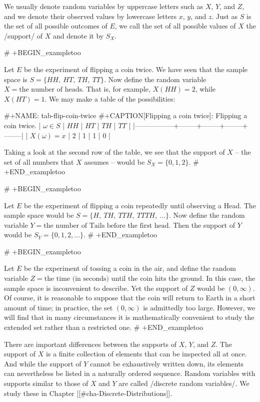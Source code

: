 We usually denote random variables by uppercase letters such as \(X\),
\(Y\), and \(Z\), and we denote their observed values by lowercase
letters \(x\), \(y\), and \(z\). Just as \(S\) is the set of all
possible outcomes of \(E\), we call the set of all possible values of
\(X\) the /support/ of \(X\) and denote it by \(S_{X}\).

# +BEGIN_exampletoo

Let \(E\) be the experiment of flipping a coin twice. We have seen
that the sample space is \( S = \{ HH,\ HT,\ TH,\ TT \} \). Now define
the random variable \(X = \mbox{the number of heads}\). That is, for
example, \(X(HH)=2\), while \(X(HT)=1\). We may make a table of the
possibilities:

#+NAME: tab-flip-coin-twice
#+CAPTION[Flipping a coin twice]: Flipping a coin twice.
| \(\omega\in S\) | \(HH\) | \(HT\) | \(TH\) | \(TT\) |
|-----------------+--------+--------+--------+--------|
| \(X(\omega)=x\) |      2 |      1 |      1 |      0 |

Taking a look at the second row of the table, we see that the support
of \(X\) -- the set of all numbers that \(X\) assumes -- would be \(
S_{X}= \{ 0,1,2 \} \).
# +END_exampletoo


# +BEGIN_exampletoo

Let \(E\) be the experiment of flipping a coin repeatedly until
observing a Head. The sample space would be \(S= \{ H,\ TH,\ TTH,\
TTTH,\ \ldots \} \). Now define the random variable \(Y=\mbox{the
number of Tails before the first head}\). Then the support of \(Y\)
would be \( S_{Y}= \{ 0,1,2,\ldots \} \).
# +END_exampletoo


# +BEGIN_exampletoo

Let \(E\) be the experiment of tossing a coin in the air, and define
the random variable \( Z = \mbox{the time (in seconds) until the coin
hits the ground} \). In this case, the sample space is inconvenient to
describe. Yet the support of \(Z\) would be \((0,\infty)\). Of course,
it is reasonable to suppose that the coin will return to Earth in a
short amount of time; in practice, the set \((0,\infty)\) is
admittedly too large. However, we will find that in many circumstances
it is mathematically convenient to study the extended set rather than
a restricted one.
# +END_exampletoo


There are important differences between the supports of \(X\), \(Y\),
and \(Z\). The support of \(X\) is a finite collection of elements
that can be inspected all at once. And while the support of \(Y\)
cannot be exhaustively written down, its elements can nevertheless be
listed in a naturally ordered sequence. Random variables with supports
similar to those of \(X\) and \(Y\) are called /discrete random
variables/. We study these in Chapter [[#cha-Discrete-Distributions]].

